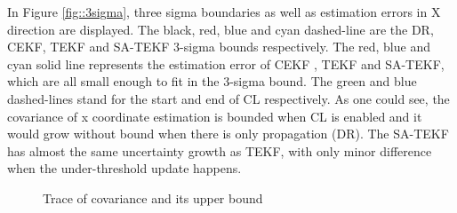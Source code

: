 \documentclass[conference]{IEEEtran}
\begin{document}
In Figure \ref{fig::3sigma}, three sigma boundaries as well as estimation errors in X direction are displayed.
The black, red, blue and cyan dashed-line are the DR, CEKF, TEKF and SA-TEKF 3-sigma bounds respectively. The red, blue and cyan solid line represents the estimation error of CEKF , TEKF and SA-TEKF, which are all small enough to fit in the 3-sigma bound.
The green and blue dashed-lines stand for the start and end of CL respectively.
As one could see, the covariance of x coordinate estimation is bounded when CL is enabled and it would grow without bound when there is only propagation (DR).
The SA-TEKF has almost the same uncertainty growth as TEKF, with only minor difference when the under-threshold update happens.
\begin{figure}
	\centering
	\caption{Trace of covariance and its upper bound}
	\label{fig::trace}
\end{figure}
\end{document}
